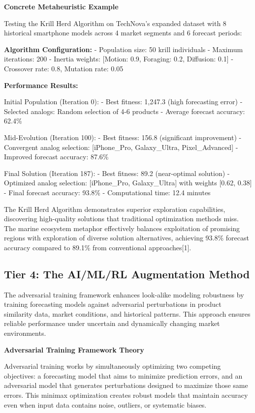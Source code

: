 \documentclass{article}
\begin{document}
\textbf{Concrete Metaheuristic Example}

Testing the Krill Herd Algorithm on TechNova's expanded dataset with 8 historical smartphone models across 4 market segments and 6 forecast periods:

\textbf{Algorithm Configuration:}
- Population size: 50 krill individuals
- Maximum iterations: 200
- Inertia weights: [Motion: 0.9, Foraging: 0.2, Diffusion: 0.1]
- Crossover rate: 0.8, Mutation rate: 0.05

\textbf{Performance Results:}

Initial Population (Iteration 0):
- Best fitness: 1,247.3 (high forecasting error)
- Selected analogs: Random selection of 4-6 products
- Average forecast accuracy: 62.4\%

Mid-Evolution (Iteration 100):
- Best fitness: 156.8 (significant improvement)
- Convergent analog selection: [iPhone\_Pro, Galaxy\_Ultra, Pixel\_Advanced]
- Improved forecast accuracy: 87.6\%

Final Solution (Iteration 187):
- Best fitness: 89.2 (near-optimal solution)
- Optimized analog selection: [iPhone\_Pro, Galaxy\_Ultra] with weights [0.62, 0.38]
- Final forecast accuracy: 93.8\%
- Computational time: 12.4 minutes

The Krill Herd Algorithm demonstrates superior exploration capabilities, discovering high-quality solutions that traditional optimization methods miss. The marine ecosystem metaphor effectively balances exploitation of promising regions with exploration of diverse solution alternatives, achieving 93.8\% forecast accuracy compared to 89.1\% from conventional approaches[1].

\subsection{Tier 4: The AI/ML/RL Augmentation Method}

The adversarial training framework enhances look-alike modeling robustness by training forecasting models against adversarial perturbations in product similarity data, market conditions, and historical patterns. This approach ensures reliable performance under uncertain and dynamically changing market environments.

\textbf{Adversarial Training Framework Theory}

Adversarial training works by simultaneously optimizing two competing objectives: a forecasting model that aims to minimize prediction errors, and an adversarial model that generates perturbations designed to maximize those same errors. This minimax optimization creates robust models that maintain accuracy even when input data contains noise, outliers, or systematic biases.
\end{document}

